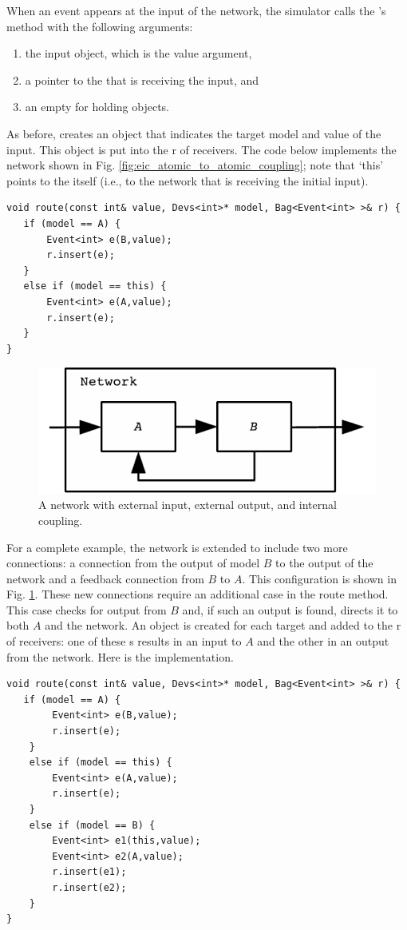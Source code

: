 When an event appears at the input of the network, the simulator calls the 's  method with the following arguments:
\begin{enumerate}
\item the input object, which is the value argument,
\item a pointer to the  that is receiving the input, and
\item an empty  for holding  objects.
\end{enumerate}
As before,  creates an  object that indicates the target model and value of the input. This  object is put into the  r of receivers. The code below implements the network shown in Fig. \ref{fig:eic_atomic_to_atomic_coupling}; note that `this' points to the  itself (i.e., to the network that is receiving the initial input).
\begin{verbatim}
void route(const int& value, Devs<int>* model, Bag<Event<int> >& r) {
   if (model == A) {
       Event<int> e(B,value);
       r.insert(e);
   }
   else if (model == this) {
       Event<int> e(A,value);
       r.insert(e);
   }
}
\end{verbatim}

\begin{figure}[ht]
\centering
\includegraphics{network_models_figs/big_coupled.pdf}
\caption{A network with external input, external output, and internal coupling.}
\label{fig:big_coupling}
\end{figure}
For a complete example, the network is extended to include two more connections: a connection from the output of model $B$ to the output of the network and a feedback connection from $B$ to $A$. This configuration is shown in Fig. \ref{fig:big_coupling}. These new connections require an additional case in the route method. This case checks for output from $B$ and, if such an output is found, directs it to both $A$ and the network. An  object is created for each target and added to the  r of receivers: one of these s results in an input to $A$ and the other in an output from the network. Here is the implementation.
\begin{verbatim}
void route(const int& value, Devs<int>* model, Bag<Event<int> >& r) {
   if (model == A) {
        Event<int> e(B,value);
        r.insert(e);
    }
    else if (model == this) {
        Event<int> e(A,value);
        r.insert(e);
    }
    else if (model == B) {
        Event<int> e1(this,value);
        Event<int> e2(A,value);
        r.insert(e1);
        r.insert(e2);
    }
}
\end{verbatim}

